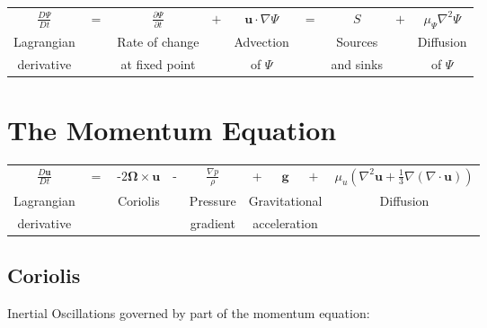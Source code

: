\begin{center}
\begin{tabular}{ccccccccc}
$\frac{D\Psi}{Dt}$ & $=$ & $\frac{\partial\Psi}{\partial t}$ & $+$ & $\mathbf{u}\cdot\nabla\Psi$ & $=$ & $S$ & $+$ & $\mu_{\Psi}\nabla^{2}\Psi$\tabularnewline
Lagrangian &  & Rate of change &  & Advection &  & Sources &  & Diffusion\tabularnewline
derivative &  & at fixed point &  & of $\Psi$ &  & and sinks &  & of $\Psi$\tabularnewline
\end{tabular}
\par\end{center}



\section{The Momentum Equation\label{sec:momEqn}}

\begin{center}
\begin{tabular}{ccccccccc}
$\frac{D\mathbf{u}}{Dt}$ & $=$ & $\text{-}2\bm{\Omega}\times\mathbf{u}$ & - & $\frac{\nabla p}{\rho}$ & + & $\mathbf{g}$ & $+$ & $\mu_{u}\left(\nabla^{2}\mathbf{u}+\frac{1}{3}\nabla(\nabla\cdot\mathbf{u})\right)$\tabularnewline
Lagrangian &  & Coriolis &  & Pressure & \multicolumn{3}{c}{Gravitational} & Diffusion\tabularnewline
derivative &  &  &  & gradient & \multicolumn{3}{c}{acceleration} & \tabularnewline
\end{tabular}
\par\end{center}


\subsection{Coriolis\label{sub:Coriolis}}

Inertial Oscillations governed by part of the momentum equation:

